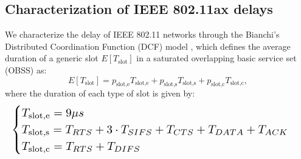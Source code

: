 \documentclass[conference]{IEEEtran}
\theoremstyle{definition}
\begin{document}


\appendix

\subsection{Characterization of IEEE 802.11ax delays}
\label{section:delay_wifi}
We characterize the delay of IEEE 802.11 networks through the Bianchi's Distributed Coordination Function (DCF) model \cite{bianchi2000performance}, which defines the average duration of a generic slot $E[T_\text{slot}]$ in a saturated overlapping basic service set (OBSS) as:
\begin{equation}
    E[T_\text{slot}] = p_{\text{slot,e}} T_\text{slot,e} + p_{\text{slot,s}} T_\text{slot,s} + p_{\text{slot,c}} T_\text{slot,c},
\end{equation}
where the duration of each type of slot is given by:
\begin{equation}
  \resizebox{\columnwidth}{!}{%
   $\begin{cases}
       T_\text{slot,e} = 9 \mu s\\
       T_\text{slot,s} = T_{RTS} + 3\cdot T_{SIFS} + T_{CTS} + T_{DATA} + T_{ACK}\\
       T_\text{slot,c} = T_{RTS} + T_{DIFS}
   \end{cases} $
   }
\end{equation}
\end{document}
